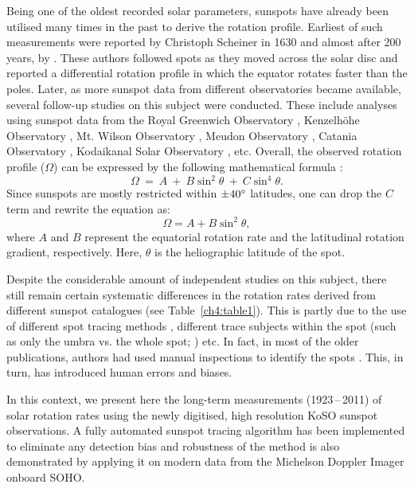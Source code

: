 Being one of the oldest recorded solar parameters, sunspots have already been utilised many times in the past to derive the rotation profile. Earliest of such measurements were reported by Christoph Scheiner in 1630 and almost after 200 years, by \citet{Carrington1863}. These authors followed spots as they moved across the solar disc and reported a differential rotation profile in which the equator rotates faster than the poles. Later, as more sunspot data from different observatories became available, several follow-up studies on this subject were conducted. These include analyses using sunspot data from the Royal Greenwich Observatory \citep[][etc]{Newton1951, Ward1966, Balthasar1986, Javaraiah2005a}, Kenzelh\"ohe Observatory \citep{Lustig1983}, Mt. Wilson Observatory \citep[][etc.]{Howard1984, Gilman1984, Gilman1985}, Meudon Observatory \citep{Ribes1993}, Catania Observatory \citep{Ternullo1981}, Kodaikanal Solar Observatory \citep[KoSO:][]{Howard1999, Gupta1999}, etc. Overall, the observed rotation profile ($\Omega$) can be expressed by the following mathematical formula \citep{Newton1951, Howard1984}:
%
\begin{equation}
    \Omega~=~A~+~B\sin^2 {\theta}~+~C\sin^4{\theta}.
    \label{eq1}
\end{equation}
%
Since sunspots are mostly restricted within $\pm40 ^\circ$ latitudes, one can drop the $C$ term \citep{Newton1951, Howard1984, Woehl2010} and rewrite the equation as:
\begin{equation}
    \Omega=A+B\sin^2{\theta},
    \label{ch4:eq2}
\end{equation}
%
where $A$ and $B$ represent the equatorial rotation rate and the latitudinal rotation gradient, respectively. Here, $\theta$ is the heliographic latitude of the spot.


Despite the considerable amount of independent studies on this subject, there still remain certain systematic differences in the rotation rates derived from different sunspot catalogues (see Table~\ref{ch4:table1}). This is partly due to the use of different spot tracing methods \citep{Newton1951, Howard1984, PoljancicBeljan2017}, different trace subjects within the spot (such as only the umbra vs. the whole spot; \citealp{Howard1999, Gupta1999}) etc. In fact, in most of the older publications, authors had used manual inspections to identify the spots \citep{Newton1951, Gupta1999}. This, in turn, has introduced human errors and biases.


In this context, we present here the long-term measurements (1923\,--\,2011) of solar rotation rates using the newly digitised, high resolution KoSO sunspot observations. A fully automated sunspot tracing algorithm has been implemented to eliminate any detection bias and robustness of the method is also demonstrated by applying it on modern data from the Michelson Doppler Imager \citep[MDI:][]{Scherrer1995} onboard SOHO.


